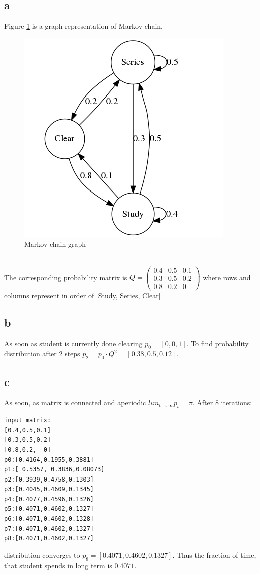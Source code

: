 \subsection*{a}
Figure \ref{fig:MC} is a graph representation of Markov chain.\\
\begin{figure}[h!]
	\centering
	\includegraphics[width=0.5\linewidth]{task5-graph.png}
	\caption{Markov-chain graph}
	\label{fig:MC}
\end{figure}\\
The corresponding probability matrix is $Q = 
\begin{pmatrix}
	0.4 & 0.5 & 0.1 \\
	0.3 & 0.5 & 0.2 \\
	0.8 & 0.2 & 0
\end{pmatrix}
$
where rows and columns represent in order of [Study, Series, Clear]
\subsection*{b}
As soon as student is currently done clearing $p_0 = [0, 0, 1]$. To find probability distribution after 2 steps
$p_2 = p_0\cdot Q^2 = [0.38, 0.5, 0.12]$. 
\subsection*{c}
As soon, as matrix is connected and aperiodic $lim_{t\to \infty}p_t = \pi$. After 8 iterations:
\begin{verbatim}
input matrix:
[0.4,0.5,0.1]
[0.3,0.5,0.2]
[0.8,0.2,  0]
p0:[0.4164,0.1955,0.3881]
p1:[ 0.5357, 0.3836,0.08073]
p2:[0.3939,0.4758,0.1303]
p3:[0.4045,0.4609,0.1345]
p4:[0.4077,0.4596,0.1326]
p5:[0.4071,0.4602,0.1327]
p6:[0.4071,0.4602,0.1328]
p7:[0.4071,0.4602,0.1327]
p8:[0.4071,0.4602,0.1327]
\end{verbatim}
distribution converges to $p_8 = [0.4071,0.4602,0.1327]$. Thus the fraction of time, that student spends in long term is $0.4071$.
